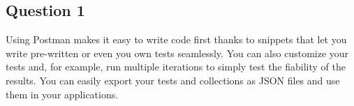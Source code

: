 \newpage
\subsection*{Question 1}
\noindent Using Postman makes it easy to write code first thanks to snippets that let you write pre-written or even you own tests seamlessly. You can also customize your tests and, for example, run multiple iterations to simply test the fiability of the results. You can easily export your tests and collections as JSON files and use them in your applications.